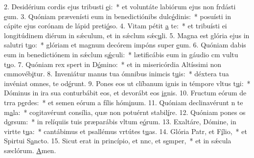 2. Desidérium cordis ejus tribusti \uline{e}i:~* et voluntáte labiórum ejus non frdásti \uline{e}um.
3. Quóniam prævenísti eum in benedictiónibs dulc\uline{é}dinis:~* posuísti in cápite ejus corónam de lápid preti\uline{ó}so.
4. Vitam pétit \uline{a} te:~* et tribuísti ei longitúdinem diérum in sǽculum, et in sǽclum sǽc\uline{u}li.
5. Magna est glória ejus in salutri t\uline{u}o:~* glóriam et magnum decórem impóns super \uline{e}um.
6. Quóniam dabis eum in benedictiónem in sǽclum s\uline{ǽ}culi:~* lætificábis eum in gáudio cm vultu t\uline{u}o.
7. Quóniam rex spert in D\uline{ó}mino:~* et in misericórdia Altíssimi non cmmovéb\uline{i}tur.
8. Inveniátur manus tua ómnibus inimcis t\uline{u}is:~* déxtera tua invéniat omnes,  te od\uline{é}runt.
9. Pones eos ut clíbanum ignis in témpore vltus t\uline{u}i:~* Dóminus in ira sua conturbábit eos, et devorábt eos \uline{i}gnis.
10. Fructum eórum de trra p\uline{e}rdes:~* et semen eórum a fílis hóm\uline{i}num.
11. Quóniam declinavérunt n te m\uline{a}la:~* cogitavérunt consília, quæ non potuérnt stabil\uline{í}re.
12. Quóniam pones os d\uline{o}rsum:~* in relíquiis tuis præparábis vltum e\uline{ó}rum.
13. Exaltáre, Dómine, in virtte t\uline{u}a:~* cantábimus et psallémus vrtútes t\uline{u}as.
14. Glória Patr, et F\uline{í}lio,~* et Spirtui S\uline{a}ncto.
15. Sicut erat in princípio, et nnc, et s\uline{e}mper,~* et in sǽcula sæclórum. \uline{A}men.
